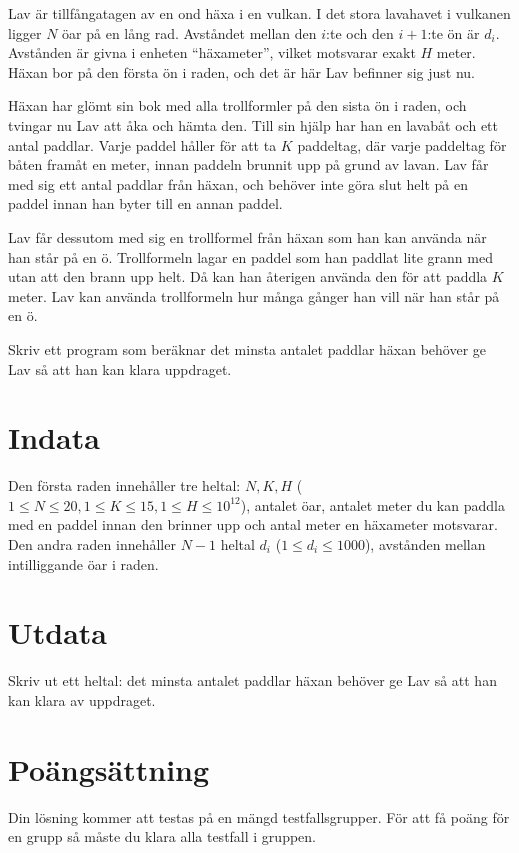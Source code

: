 Lav är tillfångatagen av en ond häxa i en vulkan. I det stora lavahavet i vulkanen ligger $N$ öar på en lång rad.
Avståndet mellan den $i$:te och den $i+1$:te ön är $d_i$. Avstånden är givna i enheten ``häxameter'', vilket motsvarar exakt $H$ meter. Häxan bor på den första ön i raden, och det är här Lav befinner sig just nu.

Häxan har glömt sin bok med alla trollformler på den sista ön i raden, och tvingar nu Lav att åka och hämta den. Till sin hjälp har han en lavabåt och ett antal paddlar. 
Varje paddel håller för att ta $K$ paddeltag, där varje paddeltag för båten framåt en meter, innan paddeln brunnit upp på grund av lavan.
Lav får med sig ett antal paddlar från häxan, och behöver inte göra slut helt på en paddel innan han byter till en annan paddel.

Lav får dessutom med sig en trollformel från häxan som han kan använda när han står på en ö. Trollformeln lagar en paddel som han paddlat lite grann med utan att den brann upp helt.
Då kan han återigen använda den för att paddla $K$ meter. Lav kan använda trollformeln hur många gånger han vill när han står på en ö.

Skriv ett program som beräknar det minsta antalet paddlar häxan behöver ge Lav så att han kan klara uppdraget.

\section*{Indata}
Den första raden innehåller tre heltal: $N, K, H$ ($1 \leq N \leq 20, 1 \leq K \leq 15, 1 \leq H \leq 10^{12}$), antalet öar, antalet meter du kan paddla med en paddel innan den brinner upp och antal meter en häxameter motsvarar.
Den andra raden innehåller $N-1$ heltal $d_i$ ($1 \leq d_i \leq 1000$), avstånden mellan intilliggande öar i raden.

\section*{Utdata}
Skriv ut ett heltal: det minsta antalet paddlar häxan behöver ge Lav så att han kan klara av uppdraget.

\section*{Poängsättning}
Din lösning kommer att testas på en mängd testfallsgrupper.
För att få poäng för en grupp så måste du klara alla testfall i gruppen.

